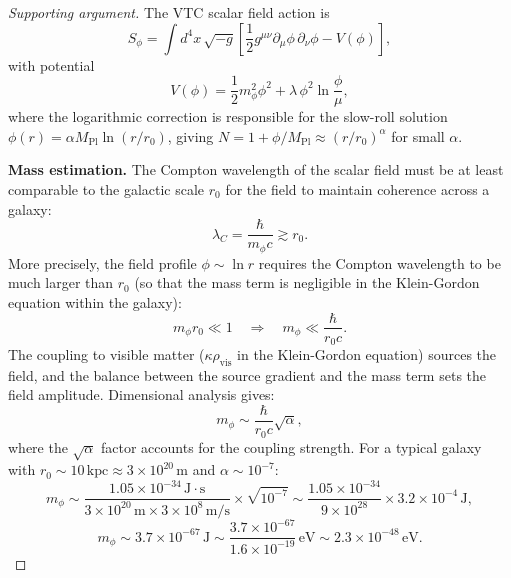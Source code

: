 \documentclass[11pt,a4paper]{article}
\theoremstyle{definition}
\newcommand{\vis}{\mathrm{vis}}
\newcommand{\Pl}{\mathrm{Pl}}
\begin{document}
\begin{proof}[Supporting argument]
The VTC scalar field action is
\begin{equation}
S_\phi = \int d^4x\,\sqrt{-g}\left[\frac{1}{2}g^{\mu\nu}\partial_\mu\phi\,\partial_\nu\phi - V(\phi)\right],
\end{equation}
with potential
\begin{equation}
V(\phi) = \frac{1}{2}m_\phi^2\phi^2 + \lambda\,\phi^2\ln\frac{\phi}{\mu},
\end{equation}
where the logarithmic correction is responsible for the slow-roll solution $\phi(r) = \alpha M_{\Pl}\ln(r/r_0)$, giving $N = 1 + \phi/M_{\Pl} \approx (r/r_0)^\alpha$ for small $\alpha$.

\textbf{Mass estimation.} The Compton wavelength of the scalar field must be at least comparable to the galactic scale $r_0$ for the field to maintain coherence across a galaxy:
\begin{equation}
\lambda_C = \frac{\hbar}{m_\phi c} \gtrsim r_0.
\end{equation}
More precisely, the field profile $\phi \sim \ln r$ requires the Compton wavelength to be much larger than $r_0$ (so that the mass term is negligible in the Klein-Gordon equation within the galaxy):
\begin{equation}
m_\phi r_0 \ll 1 \quad \Longrightarrow \quad m_\phi \ll \frac{\hbar}{r_0 c}.
\end{equation}
The coupling to visible matter ($\kappa\rho_{\vis}$ in the Klein-Gordon equation) sources the field, and the balance between the source gradient and the mass term sets the field amplitude. Dimensional analysis gives:
\begin{equation}
m_\phi \sim \frac{\hbar}{r_0 c}\sqrt{\alpha},
\end{equation}
where the $\sqrt{\alpha}$ factor accounts for the coupling strength. For a typical galaxy with $r_0 \sim 10\,\mathrm{kpc} \approx 3\times 10^{20}\,\mathrm{m}$ and $\alpha \sim 10^{-7}$:
\begin{equation}
m_\phi \sim \frac{1.05\times 10^{-34}\,\mathrm{J\cdot s}}{3\times 10^{20}\,\mathrm{m}\times 3\times 10^8\,\mathrm{m/s}}\times\sqrt{10^{-7}} \sim \frac{1.05\times 10^{-34}}{9\times 10^{28}}\times 3.2\times 10^{-4}\,\mathrm{J},
\end{equation}
\begin{equation}
m_\phi \sim 3.7\times 10^{-67}\,\mathrm{J} \sim \frac{3.7\times 10^{-67}}{1.6\times 10^{-19}}\,\mathrm{eV} \sim 2.3\times 10^{-48}\,\mathrm{eV}.
\end{equation}


\end{proof}
\end{document}
